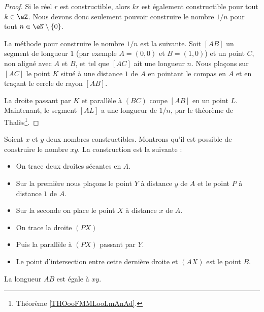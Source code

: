 \begin{proof}
	Si le réel \( r\) est constructible, alors \( kr\) est également constructible pour tout \( k\in \eZ\). Nous devons donc seulement pouvoir construire le nombre \( 1/n\) pour tout \( n\in \eN\setminus\{ 0 \}\).

	\begin{center}
		
	\end{center}

	La méthode pour construire le nombre \( 1/n\) est la suivante. Soit \( [AB]\) un segment de longueur \( 1\) (par exemple \( A=(0,0)\) et \( B=(1,0)\)) et un point \( C\), non aligné avec \( A\) et \( B\), et tel que \( [AC]\) ait une longueur \( n\). Nous plaçons sur \( [AC]\) le point \( K\) situé à une distance \( 1\) de \( A\) en pointant le compas en \( A\) et en traçant le cercle de rayon \( [AB]\).

	La droite passant par \( K\) et parallèle à \( (BC)\) coupe \( [AB]\) en un point \( L\). Maintenant, le segment \( [AL]\) a une longueur de \( 1/n\), par le théorème de Thalès\footnote{Théorème \ref{THOooFMMLooLmAnAd}.}.
\end{proof}

\begin{example}    \label{ExGROooIosiBt}
	Soient \( x\) et \( y\) deux nombres constructibles. Montrons qu'il est possible de construire le nombre \( xy\). La construction est la suivante :

	\begin{center}
		
	\end{center}

	\begin{itemize}
		\item On trace deux droites sécantes en \( A\).
		\item Sur la première nous plaçons le point \( Y\) à distance \( y\) de \( A\) et le point \( P\) à distance \( 1\) de \( A\).
		\item Sur la seconde on place le point \( X\) à distance \( x\) de \( A\).
		\item On trace la droite \( (PX)\)
		\item Puis la parallèle à \( (PX)\) passant par \( Y\).
		\item Le point d'intersection entre cette dernière droite et \( (AX)\) est le point \( B\).
	\end{itemize}
	La longueur \( AB\) est égale à \( xy\).
\end{example}

